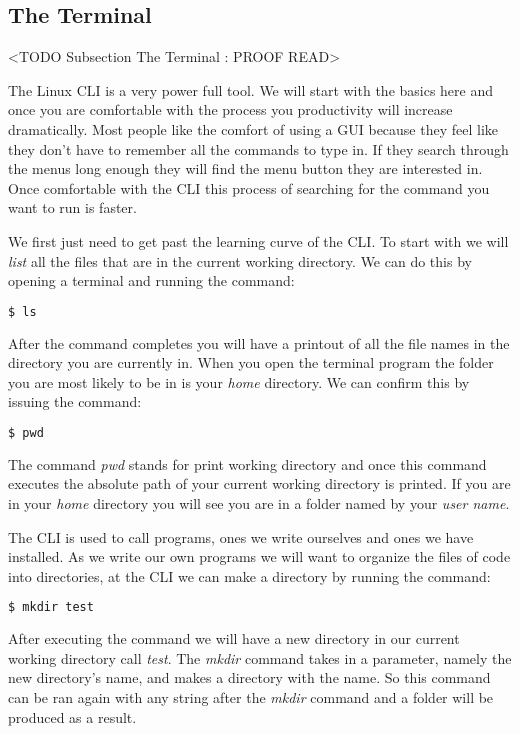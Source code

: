 \subsection{The Terminal}
	<TODO Subsection The Terminal : PROOF READ>
	
The Linux \ac{CLI} is a very power full tool. We will start with the basics here and once you are comfortable with the process you productivity will increase dramatically. Most people like the comfort of using a \ac{GUI} because they feel like they don't have to remember all the commands to type in. If they search through the menus long enough they will find the menu button they are interested in. Once comfortable with the \ac{CLI} this process of searching for the command you want to run is faster. 

We first just need to get past the learning curve of the \ac{CLI}.  To start with we will \emph{list} all the files that are in the current working directory. We can do this by opening a terminal and running the command:

\begin{lstlisting}[language=bash]
    $ ls
\end{lstlisting}	
	
After the command completes you will have a printout of all the file names in the directory you are currently in. When you open the terminal program the folder you are most likely to be in is your \emph{home} directory. We can confirm this by issuing the command:

\begin{lstlisting}[language=bash]
    $ pwd
\end{lstlisting}	

The command \emph{pwd} stands for print working directory and once this command executes the absolute path of your current working directory is printed. If you are in your \emph{home} directory you will see you are in a folder named by your \emph{user name}. 	
	
The \ac{CLI} is used to call programs, ones we write ourselves and ones we have installed. As we write our own programs we will want to organize the files of code into directories, at the \ac{CLI} we can make a directory by running the command:

\begin{lstlisting}[language=bash] 
    $ mkdir test
\end{lstlisting}	

After executing the command we will have a new directory in our current working directory call \emph{test}. The \emph{mkdir} command takes in a parameter, namely the new directory's name, and makes a directory with the name. So this command can be ran again with any string after the \emph{mkdir} command and a folder will be produced as a result. 

